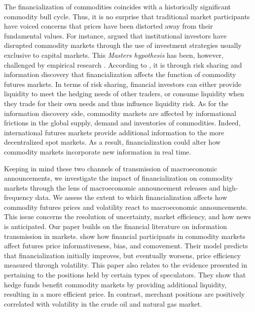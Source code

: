 \documentclass[12pt]{article}
\begin{document}
The financialization of commodities coincides with a historically significant commodity bull cycle. Thus, it is no surprise that traditional market participants have voiced concerns that prices have been distorted  away from their fundamental values. For instance, \citet{masters2009testimony} argued  that institutional investors have disrupted commodity markets through the use of investment strategies usually exclusive to capital markets. This \emph{Masters hypothesis} has been, however, challenged by empirical research \citep{irwin2011index,irwin2012testing,irwin2012financialization}. According to \citet{cheng2014financialization}, it is through risk sharing and information discovery that financialization affects the function of commodity futures markets. In terms of risk sharing, financial investors can either provide liquidity to meet the hedging needs of other traders, or consume liquidity when they trade for their own needs \citep{kang2020tale} and thus influence liquidity risk. As for the information discovery side,  commodity markets are affected by informational frictions in the global supply, demand and inventories of commodities. Indeed, international futures markets provide additional information to the more decentralized spot markets. As a result, financialization could alter how commodity markets incorporate new information in real time.

Keeping in mind these two channels of transmission of macroeconomic announcements, we investigate the impact of financialization on commodity markets through the lens of macroeconomic announcement releases and high-frequency data. We assess the extent to which financialization  affects how commodity futures prices and volatility react to macroeconomic announcements. This issue concerns the  resolution of uncertainty, market efficiency, and how news is anticipated. Our paper builds on the financial literature on  information transmission in markets. \citet{goldstein2019commodity} show how financial participants in commodity markets affect futures price informativeness, bias, and comovement. Their model predicts that financialization initially improves, but eventually worsens, price efficiency measured through volatility. This paper also relates to the evidence presented in \citet{brunetti2016speculators} pertaining to the positions held by certain types of speculators. They show that hedge funds benefit commodity markets by providing additional liquidity, resulting in a more efficient price. In contrast, merchant positions are positively correlated with volatility in the crude oil and natural gas market. 
\end{document}
